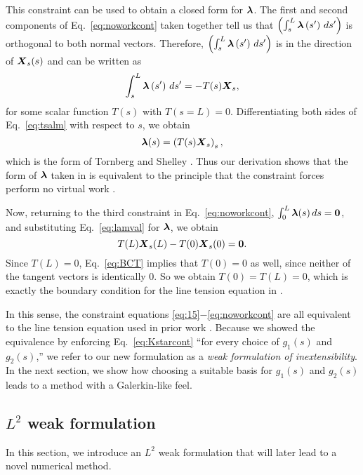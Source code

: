 This constraint can be used to obtain a closed form for $\boldsymbol{\lambda}$. The first and second components of Eq.\ \eqref{eq:noworkcont} taken together tell us that $\left(\int_{s}^L  \boldsymbol{\lambda}\left(s'\right) \, ds'\right)$ is orthogonal to both normal vectors. Therefore, $\left(\int_{s}^L  \boldsymbol{\lambda}\left(s'\right) \, ds'\right)$ is in the direction of $\boldsymbol{X}_s(s)$ and can be written as
\begin{equation}
\label{eq:tsalm}
\int_{s}^L  \boldsymbol{\lambda}\left(s'\right) \, ds' = -T(s)\boldsymbol{X}_s,
\end{equation}
for some scalar function $T(s)$ with $T(s=L)=0$. Differentiating both sides of Eq.\ \eqref{eq:tsalm} with respect to $s$, we obtain 
\begin{equation}
\label{eq:lamval}
\boldsymbol{\lambda}(s) = \left(T(s)\boldsymbol{X}_s\right)_s, 
\end{equation}
which is the form of Tornberg and Shelley \cite{ts04}. Thus our derivation shows that the form of $\boldsymbol{\lambda}$ taken in \cite{ts04} is equivalent to the principle that the constraint forces perform no virtual work \cite{varibook}. 

Now, returning to the third constraint in Eq.\ \eqref{eq:noworkcont}, $\int_0^L \boldsymbol{\lambda}(s) \, ds=\boldsymbol{0}$, and substituting Eq.\ \eqref{eq:lamval} for $\boldsymbol{\lambda}$, we obtain 
\begin{equation}
\label{eq:BCT}
T(L)\boldsymbol{X}_s(L) - T(0)\boldsymbol{X}_s(0)=\boldsymbol{0}. 
\end{equation}
Since $T(L)=0$, Eq.\ \eqref{eq:BCT} implies that $T(0)=0$ as well, since neither of the tangent vectors is identically 0. So we obtain $T(0)=T(L)=0$, which is exactly the boundary condition for the line tension equation in \cite{ts04}. 

In this sense, the constraint equations \eqref{eq:15}$-$\eqref{eq:noworkcont} are all equivalent to the line tension equation used in prior work \cite{ts04}. Because we showed the equivalence by enforcing Eq.\ \eqref{eq:Kstarcont} ``for every choice of $g_1(s)$ and $g_2(s)$,'' we refer to our new formulation as a \textit{weak formulation of inextensibility}. In the next section, we show how choosing a suitable basis for $g_1(s)$ and $g_2(s)$  leads to a method with a Galerkin-like feel.  

\subsection{$L^2$ weak formulation}
\label{sec:numinex}
In this section, we introduce an $L^2$ weak formulation that will later lead to a novel numerical method.

